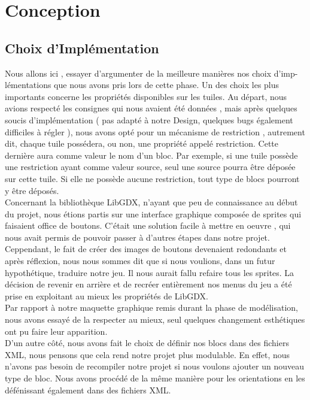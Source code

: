 \documentclass[a4paper,10pt]{article}
\begin{document}
\section{Conception}
\subsection{Choix d'Implémentation}
Nous allons ici , essayer d'argumenter de la meilleure manières nos choix d'imp-\\lémentations que nous avons pris lors de cette phase.
Un des choix les plus importants concerne les propriétés disponibles sur les tuiles. Au départ, nous avions respecté les consignes qui nous
avaient été données , mais après quelques soucis d'implémentation ( pas adapté à notre Design, quelques bugs également difficiles à régler ), nous
avons opté pour un mécanisme de restriction , autrement dit, chaque tuile possédera, ou non, une propriété appelé restriction. Cette dernière aura
comme valeur le nom d'un bloc. Par exemple, si une tuile possède une restriction ayant comme valeur source, seul une source pourra être déposée sur cette tuile.
Si elle ne possède aucune restriction, tout type de blocs pourront y être déposés. 
\\
Concernant la bibliothèque LibGDX, n'ayant que peu de connaissance au début du projet, nous étions partis sur une interface graphique composée de sprites qui faisaient
office de boutons. C'était une solution facile à mettre en oeuvre , qui nous avait permis de pouvoir passer à d'autres étapes dans notre projet.\\
Ceppendant, le fait de créer des images de boutons devenaient redondants et après réflexion, nous nous sommes dit que si nous voulions, dans un futur
hypothétique, traduire notre jeu. Il nous aurait fallu refaire tous les sprites. La décision de revenir en arrière et de recréer entièrement nos menus 
du jeu a été prise en exploitant au mieux les propriétés de LibGDX. 
\\
Par rapport à notre maquette graphique remis durant la phase de modélisation, nous avons essayé de la respecter au mieux, seul quelques changement
esthétiques ont pu faire leur apparition.
\\
D'un autre côté, nous avons fait le choix de définir nos blocs dans des fichiers XML, nous pensons que cela rend notre projet plus modulable. En effet, nous 
n'avons pas besoin de recompiler notre projet si nous voulons ajouter un nouveau type de bloc. Nous avons procédé de la même manière pour les orientations
en les défénissant également dans des fichiers XML.
\end{document}
